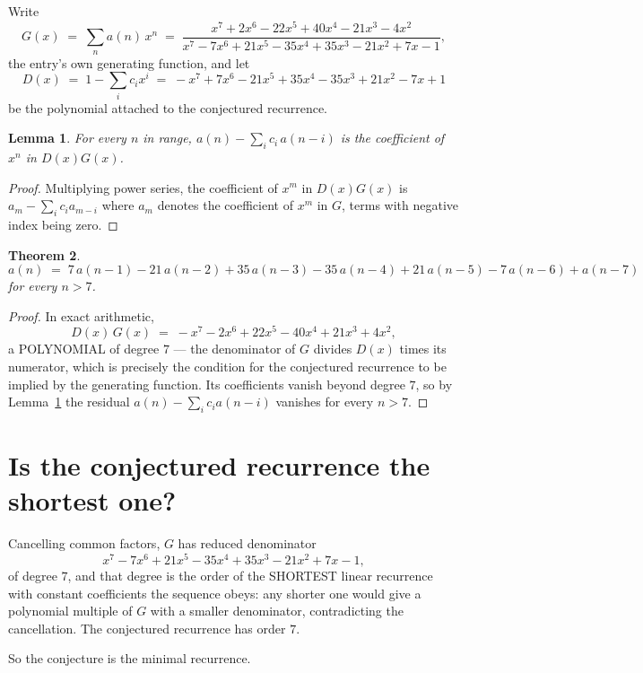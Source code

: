 \documentclass[11pt,a4paper]{article}
\theoremstyle{plain}
\newtheorem{theorem}{Theorem}
\newtheorem{lemma}[theorem]{Lemma}
\theoremstyle{definition}
\begin{document}
Write
\[
G(x)\;=\;\sum_{n}a(n)\,x^{n}\;=\;\frac{x^{7} + 2 x^{6} - 22 x^{5} + 40 x^{4} - 21 x^{3} - 4 x^{2}}{x^{7} - 7 x^{6} + 21 x^{5} - 35 x^{4} + 35 x^{3} - 21 x^{2} + 7 x - 1},
\]
the entry's own generating function, and let
\[
D(x)\;=\;1-\sum_i c_i x^{i}\;=\;- x^{7} + 7 x^{6} - 21 x^{5} + 35 x^{4} - 35 x^{3} + 21 x^{2} - 7 x + 1
\]
be the polynomial attached to the conjectured recurrence.

\begin{lemma}\label{lem:key}
For every $n$ in range, $a(n)-\sum_i c_i\,a(n-i)$ is the coefficient of $x^{n}$ in
$D(x)G(x)$.
\end{lemma}

\begin{proof}
Multiplying power series, the coefficient of $x^{m}$ in $D(x)G(x)$ is
$a_m-\sum_i c_i a_{m-i}$ where $a_m$ denotes the coefficient of $x^{m}$ in $G$, terms with
negative index being zero.
\end{proof}

\begin{theorem}
\[
a(n)\;=\;7\,a(n-1) - 21\,a(n-2) + 35\,a(n-3) - 35\,a(n-4) + 21\,a(n-5) - 7\,a(n-6) + a(n-7)
\]
for every $n>7$.
\end{theorem}

\begin{proof}
In exact arithmetic,
\[
D(x)\,G(x)\;=\;- x^{7} - 2 x^{6} + 22 x^{5} - 40 x^{4} + 21 x^{3} + 4 x^{2},
\]
a POLYNOMIAL of degree $7$ --- the denominator of $G$ divides $D(x)$ times its numerator,
which is precisely the condition for the conjectured recurrence to be implied by the
generating function. Its coefficients vanish beyond degree $7$, so by
Lemma~\ref{lem:key} the residual $a(n)-\sum_ic_ia(n-i)$ vanishes for every
$n>7$.
\end{proof}

\section{Is the conjectured recurrence the shortest one?}

Cancelling common factors, $G$ has reduced denominator
\[
x^{7} - 7 x^{6} + 21 x^{5} - 35 x^{4} + 35 x^{3} - 21 x^{2} + 7 x - 1,
\]
of degree $7$, and that degree is the order of the SHORTEST linear recurrence with
constant coefficients the sequence obeys: any shorter one would give a polynomial multiple of
$G$ with a smaller denominator, contradicting the cancellation. The conjectured recurrence has
order $7$.

So the conjecture is the minimal recurrence.
\end{document}
